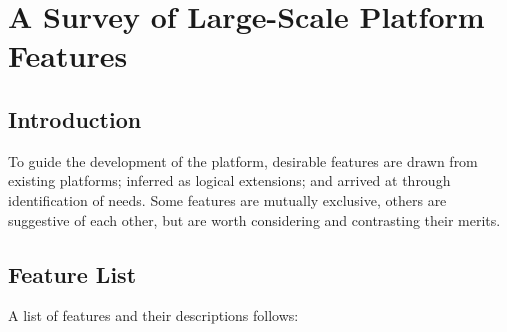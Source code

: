 \hypertarget{a-survey-of-large-scale-platform-features}{%
  \section{A Survey of Large-Scale Platform
    Features}\label{a-survey-of-large-scale-platform-features}}

\hypertarget{sec:intro}{%
  \subsection{Introduction}\label{sec:intro}}

To guide the development of the platform, desirable features are drawn
from existing platforms; inferred as logical extensions; and arrived at
through identification of needs. Some features are mutually exclusive,
others are suggestive of each other, but are worth considering and
contrasting their merits.

\hypertarget{sec:feature-list}{%
  \subsection{Feature List}\label{sec:feature-list}}

A list of features and their descriptions follows:

